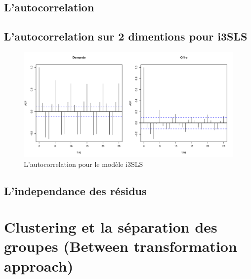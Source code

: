 \documentclass[11pt,]{article}
\begin{document}
\FloatBarrier

\hypertarget{lautocorrelation}{%
\subsection{L'autocorrelation}\label{lautocorrelation}}

\FloatBarrier

\FloatBarrier

\FloatBarrier

\hypertarget{lautocorrelation-sur-2-dimentions-pour-i3sls}{%
\subsection{L'autocorrelation sur 2 dimentions pour
i3SLS}\label{lautocorrelation-sur-2-dimentions-pour-i3sls}}

\FloatBarrier

\begin{figure}[!htbp]

{\centering \includegraphics{note2pres_files/figure-latex/unnamed-chunk-65-1} 

}

\caption{L'autocorrelation pour le modèle  i3SLS}\label{fig:unnamed-chunk-65}
\end{figure}

\FloatBarrier

\hypertarget{lindependance-des-residus}{%
\subsection{L'independance des
résidus}\label{lindependance-des-residus}}

\FloatBarrier

\FloatBarrier

\FloatBarrier

\hypertarget{clustering-et-la-separation-des-groupes-between-transformation-approach}{%
\section{Clustering et la séparation des groupes (Between transformation
approach)}\label{clustering-et-la-separation-des-groupes-between-transformation-approach}}
\end{document}

